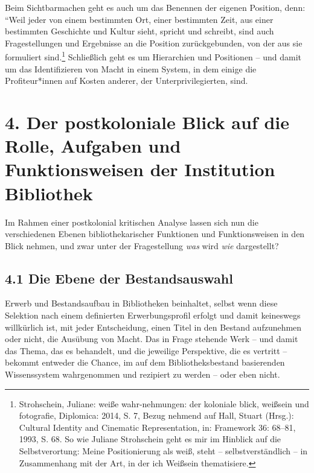 \documentclass[a4paper,
fontsize=11pt,
oneside,
numbers=noperiodatend,
parskip=half-,
bibliography=totoc,
final
]{scrartcl}
\begin{document}
Beim Sichtbarmachen geht es auch um das Benennen der eigenen Position,
denn: ``Weil jeder von einem bestimmten Ort, einer bestimmten Zeit, aus
einer bestimmten Geschichte und Kultur sieht, spricht und schreibt, sind
auch Fragestellungen und Ergebnisse an die Position zurückgebunden, von
der aus sie formuliert sind.\footnote{Strohschein, Juliane: weiße
  wahr-nehmungen: der koloniale blick, weißsein und fotografie,
  Diplomica: 2014, S. 7, Bezug nehmend auf Hall, Stuart (Hrsg.):
  Cultural Identity and Cinematic Representation, in: Framework 36:
  68--81, 1993, S. 68. So wie Juliane Strohschein geht es mir im
  Hinblick auf die Selbstverortung: Meine Positionierung als weiß, steht
  -- selbstverständlich -- in Zusammenhang mit der Art, in der ich
  Weißsein thematisiere.} Schließlich geht es um Hierarchien und
Positionen -- und damit um das Identifizieren von Macht in einem System,
in dem einige die Profiteur*innen auf Kosten anderer, der
Unterprivilegierten, sind.

\hypertarget{der-postkoloniale-blick-auf-die-rolle-aufgaben-und-funktionsweisen-der-institution-bibliothek}{%
\section{4. Der postkoloniale Blick auf die Rolle, Aufgaben und
Funktionsweisen der Institution
Bibliothek}\label{der-postkoloniale-blick-auf-die-rolle-aufgaben-und-funktionsweisen-der-institution-bibliothek}}

Im Rahmen einer postkolonial kritischen Analyse lassen sich nun die
verschiedenen Ebenen bibliothekarischer Funktionen und Funktionsweisen
in den Blick nehmen, und zwar unter der Fragestellung \emph{was} wird
\emph{wie} dargestellt?

\hypertarget{die-ebene-der-bestandsauswahl}{%
\subsection{4.1 Die Ebene der
Bestandsauswahl}\label{die-ebene-der-bestandsauswahl}}

Erwerb und Bestandsaufbau in Bibliotheken beinhaltet, selbst wenn diese
Selektion nach einem definierten Erwerbungsprofil erfolgt und damit
keineswegs willkürlich ist, mit jeder Entscheidung, einen Titel in den
Bestand aufzunehmen oder nicht, die Ausübung von Macht. Das in Frage
stehende Werk -- und damit das Thema, das es behandelt, und die
jeweilige Perspektive, die es vertritt -- bekommt entweder die Chance,
im auf dem Bibliotheksbestand basierenden Wissenssystem wahrgenommen und
rezipiert zu werden -- oder eben nicht.
\end{document}
